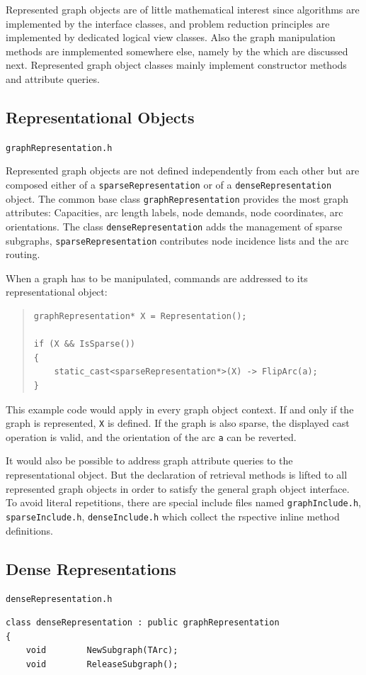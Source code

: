 \documentclass[a4paper,11pt,twoside]{book}
\begin{document}
\begin{multicols}{2}
Represented graph objects are of little mathematical interest since algorithms
are implemented by the interface classes, and problem reduction principles are
implemented by dedicated logical view classes. Also the graph manipulation
methods are inmplemented somewhere else, namely by the  which are discussed next. Represented graph object classes mainly
implement constructor methods and attribute queries.


\subsection{Representational Objects}
\myinclude\verb/graphRepresentation.h/

\bigskip\noindent
Represented graph objects are not defined independently from each other but are
composed either of a \verb/sparseRepresentation/ or of a \verb/denseRepresentation/
object. The common base class \verb/graphRepresentation/ provides the most graph
attributes: Capacities, arc length labels, node demands, node coordinates, arc
orientations. The class \verb/denseRepresentation/ adds the management of sparse
subgraphs, \verb/sparseRepresentation/ contributes node incidence lists and the
arc routing.

When a graph has to be manipulated, commands are addressed to its
representational object:
\sample
\begin{quote}
\begin{verbatim}
graphRepresentation* X = Representation();

if (X && IsSparse())
{
    static_cast<sparseRepresentation*>(X) -> FlipArc(a);
}
\end{verbatim}
\end{quote}
This example code would apply in every graph object context. If and only if the
graph is represented, \verb/X/ is defined. If the graph is also sparse, the
displayed cast operation is valid, and the orientation of the arc \verb/a/
can be reverted.

It would also be possible to address graph attribute queries to the
representational object. But the declaration of retrieval methods is
lifted to all represented graph objects in order to satisfy the general graph
object interface. To avoid literal repetitions, there are special include files
named \verb/graphInclude.h/, \verb/sparseInclude.h/, \verb/denseInclude.h/ which
collect the rspective inline method definitions.


\subsection{Dense Representations}
\label{slb_dnsstruc}
\myinclude\verb/denseRepresentation.h/
\begin{mymethods}
\begin{verbatim}
class denseRepresentation : public graphRepresentation
{
    void        NewSubgraph(TArc);
    void        ReleaseSubgraph();


\end{verbatim}
\end{mymethods}
\end{multicols}
\end{document}
